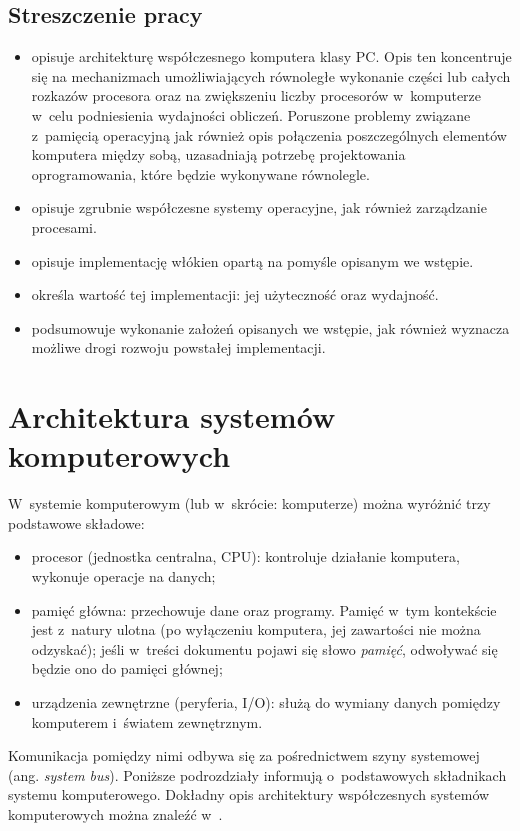 \documentclass[12pt]{mwart}
\begin{document}
\subsection{Streszczenie pracy}
\indent
	\begin{itemize}
	\item[Rozdział \ref{sec:architecture}] opisuje architekturę współczesnego komputera klasy PC. Opis ten koncentruje się na 
		mechanizmach umożliwiających równoległe wykonanie części lub całych rozkazów procesora oraz na zwiększeniu liczby procesorów
		w~komputerze w~celu podniesienia wydajności obliczeń. Poruszone problemy związane z~pamięcią operacyjną jak również opis połączenia
		poszczególnych elementów komputera między sobą, uzasadniają potrzebę projektowania oprogramowania, które będzie wykonywane równolegle.
	\item[Rozdział \ref{sec:system}] opisuje zgrubnie współczesne systemy operacyjne, jak również zarządzanie procesami.
	\item[Rozdział \ref{sec:solution}] opisuje implementację włókien opartą na pomyśle opisanym we wstępie.
	\item[Rozdział \ref{sec:analysis}] określa wartość tej implementacji: jej użyteczność oraz wydajność.
	\item[Rozdział \ref{sec:summary}] podsumowuje wykonanie założeń opisanych we wstępie, jak również wyznacza możliwe drogi rozwoju
		powstałej implementacji.
	\end{itemize}
\par
%
\newpage
\section{Architektura systemów komputerowych}
%
\label{sec:architecture}
\indent 
	W~systemie komputerowym (lub w~skrócie: komputerze) można wyróżnić trzy podstawowe składowe:
	\begin{itemize}
		\item procesor (jednostka centralna, CPU): kontroluje działanie komputera, wykonuje operacje na danych;
		\item pamięć główna: przechowuje dane oraz programy. Pamięć w~tym kontekście jest z~natury ulotna (po wyłączeniu komputera,
			jej zawartości nie można odzyskać); jeśli w~treści dokumentu pojawi się słowo \emph{pamięć}, odwoływać się będzie ono do
			pamięci głównej;
		\item urządzenia zewnętrzne (peryferia, I/O): służą do wymiany danych pomiędzy komputerem i~światem zewnętrznym.
	\end{itemize}
	Komunikacja pomiędzy nimi odbywa się za pośrednictwem szyny systemowej (ang. \emph{system bus}).
	Poniższe podrozdziały informują o~podstawowych składnikach systemu komputerowego. Dokładny opis architektury współczesnych
	systemów komputerowych można znaleźć w~\cite{hennessy}.
\par
%
\end{document}
